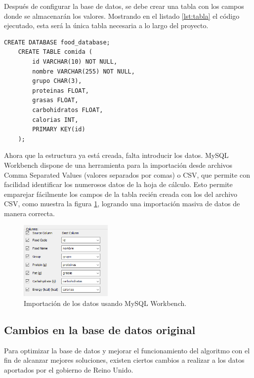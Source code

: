 \newpage

Después de configurar la base de datos, se debe crear una tabla con los campos donde se almacenarán los valores. Mostrando en el listado \ref{lst:tabla} el código ejecutado, esta será la única tabla necesaria a lo largo del proyecto.

\begin{lstlisting}[style=sqlstyle, caption=Creación de la tabla y sus campos., label={lst:tabla}]
    CREATE DATABASE food_database;
    CREATE TABLE comida (
        id VARCHAR(10) NOT NULL,
        nombre VARCHAR(255) NOT NULL,
        grupo CHAR(3),
        proteinas FLOAT,
        grasas FLOAT,
        carbohidratos FLOAT,
        calorias INT,
        PRIMARY KEY(id)
    );
\end{lstlisting}

Ahora que la estructura ya está creada, falta introducir los datos. MySQL Workbench dispone de una herramienta para la importación desde archivos Comma Separated Values (valores separados por comas) o CSV, que permite con facilidad identificar los numerosos datos de la hoja de cálculo. Esto permite emparejar fácilmente los campos de la tabla recién creada con los del archivo CSV, como muestra la figura \ref{fig:importacion}, logrando una importación masiva de datos de manera correcta.

\begin{figure}[H]
    \centering
    \includegraphics[width=0.4\textwidth]{figures/importacion.png}
    \caption{Importación de los datos usando MySQL Workbench.}
    \label{fig:importacion}
\end{figure}

\subsection{Cambios en la base de datos original}

Para optimizar la base de datos y mejorar el funcionamiento del algoritmo con el fin de alcanzar mejores soluciones, existen ciertos cambios a realizar a los datos aportados por el gobierno de Reino Unido.

